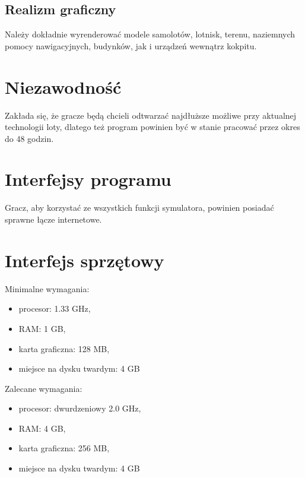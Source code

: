 \documentclass{mwrep}
\begin{document}
\subsection{Realizm graficzny}
Należy dokładnie wyrenderować modele samolotów, lotnisk, terenu, naziemnych pomocy nawigacyjnych, budynków, jak i urządzeń wewnątrz kokpitu.

\section{Niezawodność}
Zakłada się, że gracze będą chcieli odtwarzać najdłuższe możliwe przy aktualnej technologii loty, dlatego też program powinien być w stanie pracować przez okres do 48 godzin.

\section{Interfejsy programu}
Gracz, aby korzystać ze wszystkich funkcji symulatora, powinien posiadać sprawne łącze internetowe.

\section{Interfejs sprzętowy}
Minimalne wymagania:
\begin{itemize}
\item procesor: 1.33 GHz,
\item RAM: 1 GB,
\item karta graficzna: 128 MB,
\item miejsce na dysku twardym: 4 GB
\end{itemize}
\vspace{1ex}
Zalecane wymagania:
\begin{itemize}
\item procesor: dwurdzeniowy 2.0 GHz,
\item RAM: 4 GB,
\item karta graficzna: 256 MB,
\item miejsce na dysku twardym: 4 GB
\end{itemize}
\end{document}
